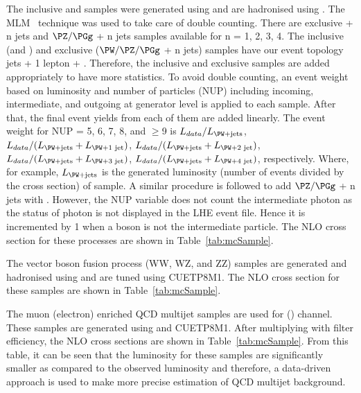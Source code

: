 The inclusive \wjets and \dyjets samples were generated using \MGvATNLO and are hadronised using 
\PYTHIA. The MLM~\cite{ Alwall:2007fs} technique was used to take care of double counting. There
are exclusive \PW + n jets and $\PZ/\PGg$ + n jets samples available for n = 1, 2, 3, 4. 
The inclusive (\wjets and \dyjets) and exclusive ($\PW/\PZ/\PGg$ + n jets) samples have our event 
topology  jets + 1 lepton + \MET. Therefore, the inclusive and exclusive samples are added 
appropriately to have more statistics. To avoid double counting, an 
event weight based on luminosity and number of particles (NUP) 
including incoming, intermediate, and outgoing at generator level is 
applied to each sample. After that, the final event yields from each of
them are added linearly. The event weight for NUP = 5, 6, 7, 8, and $\geq$9 is
 $L_{data}/L_{\wjets}$, $L_{data}/(L_{\wjets} + L_{\PW + \text{1 jet}})$, 
 $L_{data}/(L_{\wjets} + L_{\PW + \text{2 jet}})$, 
 $L_{data}/(L_{\wjets} + L_{\PW + \text{3 jet}})$,
 $L_{data}/(L_{\wjets} + L_{\PW + \text{4 jet}})$, respectively.
 Where, for example, $L_{\wjets}$ is the generated luminosity (number 
 of events divided by the cross section) of \wjets sample. A similar 
 procedure is followed to add $\PZ/\PGg$ + n jets with \dyjets. However,
 the NUP variable does not count the intermediate photon as the status
 of photon is not displayed in the LHE event file. Hence it is
 incremented by 1 when a \PZ boson is not the intermediate particle.
 The NLO cross section for these processes are shown in Table~\ref{tab:mcSample}.

The vector boson fusion process (WW, WZ, and ZZ) samples are generated and hadronised 
using \PYTHIA and are tuned using CUETP8M1. The NLO cross section for these samples are shown 
in Table~\ref{tab:mcSample}.

The muon (electron) enriched QCD multijet samples are used for \mujets (\ejets) channel. These 
samples are generated using \PYTHIA and CUETP8M1. After multiplying with filter efficiency, the 
NLO cross sections are shown in Table~\ref{tab:mcSample}. From this table, it can be seen that the 
luminosity for these samples are significantly 
smaller as compared to the observed luminosity and therefore, a data-driven approach is used to 
make more precise estimation of QCD multijet background.

